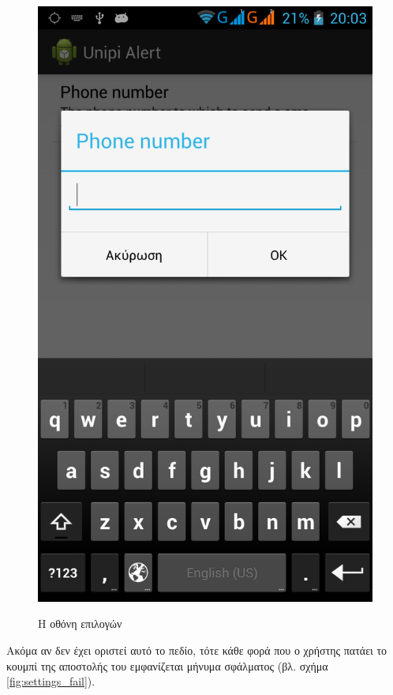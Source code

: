 \documentclass{assignment}
\begin{document}
\begin{figure}
\begin{center}
{\includegraphics{images/settings_phone_number.png}
}
\caption{Η οθόνη επιλογών}
\label{fig:settings}
\end{center}
\end{figure}

Ακόμα αν δεν έχει οριστεί αυτό το πεδίο, τότε κάθε φορά που ο χρήστης πατάει το κουμπί της αποστολής του εμφανίζεται μήνυμα σφάλματος (βλ. σχήμα \ref{fig:settings_fail}). 
\end{document}
